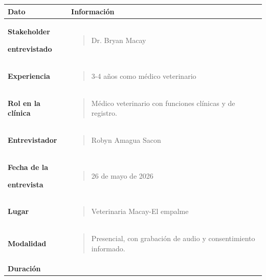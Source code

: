 \documentclass[
]{article}
\newcounter{none} %
\begin{document}
{\def\LTcaptype{none} %
\begin{longtable}[]{@{}
  >{\raggedright\arraybackslash}p{}
  >{\raggedright\arraybackslash}p{}@{}}
\toprule\noalign{}
\begin{minipage}[b]{\linewidth}\centering
\textbf{Dato}
\end{minipage} & \begin{minipage}[b]{\linewidth}\centering
\textbf{Información}
\end{minipage} \\
\midrule\noalign{}
\endhead
\bottomrule\noalign{}
\endlastfoot
\textbf{Stakeholder}

\textbf{entrevistado} & \begin{minipage}[t]{\linewidth}\raggedright
\begin{quote}
Dr. Bryan Macay
\end{quote}
\end{minipage} \\
\textbf{Experiencia} & \begin{minipage}[t]{\linewidth}\raggedright
\begin{quote}
3-4 años como médico veterinario
\end{quote}
\end{minipage} \\
\textbf{Rol en la clínica} & \begin{minipage}[t]{\linewidth}\raggedright
\begin{quote}
Médico veterinario con funciones clínicas y de registro.
\end{quote}
\end{minipage} \\
\textbf{Entrevistador} & \begin{minipage}[t]{\linewidth}\raggedright
\begin{quote}
Robyn Amagua Sacon
\end{quote}
\end{minipage} \\
\textbf{Fecha de la}

\textbf{entrevista} & \begin{minipage}[t]{\linewidth}\raggedright
\begin{quote}
26 de mayo de 2026
\end{quote}
\end{minipage} \\
\textbf{Lugar} & \begin{minipage}[t]{\linewidth}\raggedright
\begin{quote}
Veterinaria Macay-El empalme
\end{quote}
\end{minipage} \\
\textbf{Modalidad} & \begin{minipage}[t]{\linewidth}\raggedright
\begin{quote}
Presencial, con grabación de audio y consentimiento informado.
\end{quote}
\end{minipage} \\
\textbf{Duración}


\end{longtable}}
\end{document}
